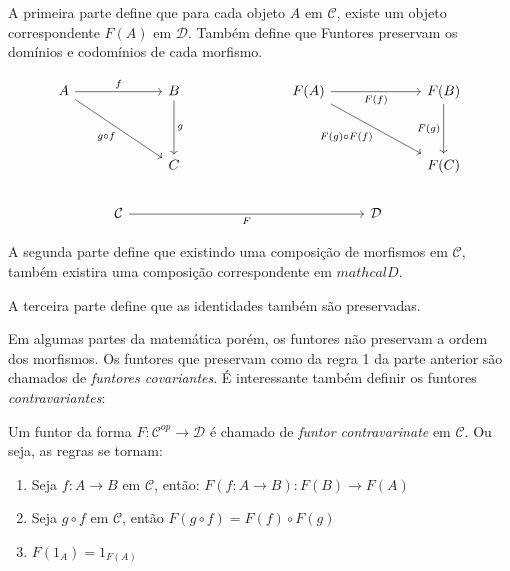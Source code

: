 \documentclass[../main.tex]{subfiles}
\begin{document}
A primeira parte define que para cada objeto $A$ em $\mathcal{C}$, existe um objeto correspondente $F(A)$ em $\mathcal{D}$. Também define que Funtores preservam os domínios e codomínios de cada morfismo.

\[\begin{tikzcd}
	A && B &&& {F(A)} && {F(B)} \\
	\\
	&& C &&&&& {F(C)} \\
	& {\mathcal{C}} &&&&& {\mathcal{D}}
	\arrow["f", from=1-1, to=1-3]
	\arrow["{g \circ f}"', from=1-1, to=3-3]
	\arrow["g", from=1-3, to=3-3]
	\arrow["{F(f)}"', from=1-6, to=1-8]
	\arrow["{F(g) \circ F(f)}"', from=1-6, to=3-8]
	\arrow["{F(g)}"', from=1-8, to=3-8]
	\arrow["F"', from=4-2, to=4-7]
\end{tikzcd}\]

A segunda parte define que existindo uma composição de morfismos em $\mathcal{C}$, também existira uma composição correspondente em $mathcal{D}$.

A terceira parte define que as identidades também são preservadas.

Em algumas partes da matemática porém, os funtores não preservam a ordem dos morfismos. Os funtores que preservam como da regra 1 da parte anterior são chamados de \emph{funtores covariantes}. É interessante também definir os funtores \emph{contravariantes}:

\begin{definition}
    Um funtor da forma $F : \mathcal{C}^{op} \to \mathcal{D}$ é chamado de \emph{funtor contravarinate} em $\mathcal{C}$. Ou seja, as regras se tornam:
    \begin{enumerate}
        \item Seja $f : A \to B$ em $\mathcal{C}$, então: $F(f : A \to B) : F(B) \to F(A)$
        \item Seja $g \circ f$ em $\mathcal{C}$, então $F(g \circ f) = F(f) \circ F(g)$
        \item $F(1_A) = 1_{F(A)}$
    \end{enumerate}  
\end{definition}
\end{document}
